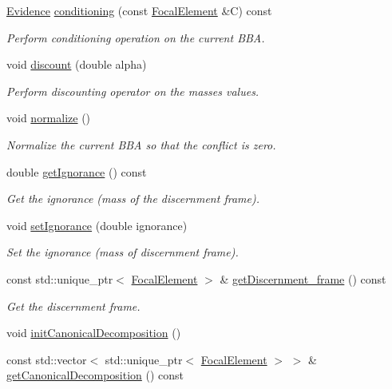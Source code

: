 \begin{DoxyCompactItemize}
\hyperlink{classEvidence}{Evidence} \hyperlink{classEvidence_a1ad5b5d0d7df6fee326ba30aa4b015c6}{conditioning} (const \hyperlink{classFocalElement}{Focal\+Element} \&C) const 
\begin{DoxyCompactList}\small\item\em Perform conditioning operation on the current B\+BA. \end{DoxyCompactList}\item 
void \hyperlink{classEvidence_afaa46e0ce034a05c4749c7021430d60a}{discount} (double alpha)
\begin{DoxyCompactList}\small\item\em Perform discounting operator on the masses values. \end{DoxyCompactList}\item 
void \hyperlink{classEvidence_aa6a44be2f65aa439e2bdcf9333659abb}{normalize} ()
\begin{DoxyCompactList}\small\item\em Normalize the current B\+BA so that the conflict is zero. \end{DoxyCompactList}\item 
double \hyperlink{classEvidence_a2d6b2109c1347c004d00c2ef6bd515d8}{get\+Ignorance} () const 
\begin{DoxyCompactList}\small\item\em Get the ignorance (mass of the discernment frame). \end{DoxyCompactList}\item 
void \hyperlink{classEvidence_a11377c6946b7727015936b35dcf86cc8}{set\+Ignorance} (double ignorance)
\begin{DoxyCompactList}\small\item\em Set the ignorance (mass of discernment frame). \end{DoxyCompactList}\item 
const std\+::unique\+\_\+ptr$<$ \hyperlink{classFocalElement}{Focal\+Element} $>$ \& \hyperlink{classEvidence_a875150a8830c15d0cf3391d73889214e}{get\+Discernment\+\_\+frame} () const 
\begin{DoxyCompactList}\small\item\em Get the discernment frame. \end{DoxyCompactList}\item 
void \hyperlink{classEvidence_a0a89c7ef1bb5e9e9cc2c761c4a58e006}{init\+Canonical\+Decomposition} ()
\item 
const std\+::vector$<$ std\+::unique\+\_\+ptr$<$ \hyperlink{classFocalElement}{Focal\+Element} $>$ $>$ \& \hyperlink{classEvidence_ad939c330f37c0e1a7da3a5b0829c1686}{get\+Canonical\+Decomposition} () const 

\end{DoxyCompactItemize}
